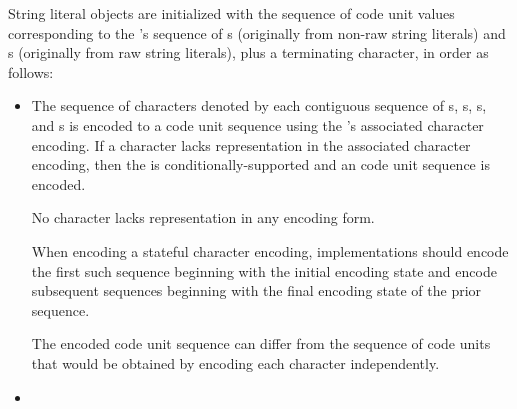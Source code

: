 \documentclass{wg21}
\newcommand{\replaceucs}{\changed{UCS}{Unicode}}
\begin{document}
\pnum
{}%
%
%
String literal objects are initialized with
the sequence of code unit values
corresponding to the 's sequence of
s (originally from non-raw string literals) and
s (originally from raw string literals),
plus a terminating  character,
in order as follows:
\begin{itemize}
    \item
    The sequence of characters denoted by each contiguous sequence of
    s,
    s,
    s, and
    s
    is encoded to a code unit sequence
    using the 's associated character encoding.
    If a character lacks representation in the associated character encoding,
    then the  is conditionally-supported and
    an
    code unit sequence is encoded.
    \begin{note}
        No character lacks representation in any  \replaceucs{} encoding form.
    \end{note}
    When encoding a stateful character encoding,
    implementations should encode the first such sequence
    beginning with the initial encoding state and
    encode subsequent sequences
    beginning with the final encoding state of the prior sequence.
    \begin{note}
        The encoded code unit sequence can differ from
        the sequence of code units that would be obtained by
        encoding each character independently.
    \end{note}
    \item
\end{itemize}
\end{document}
